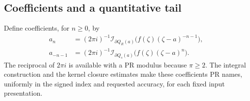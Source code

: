 \documentclass[11pt]{article}
\theoremstyle{definition}
\newcommand{\Int}{\mathcal I}
\newcommand{\bd}{\partial}
\begin{document}
\subsection{Coefficients and a quantitative tail}

Define coefficients, for \(n\ge0\), by
\begin{align}
 a_n&=(2\pi i)^{-1}
      \Int_{\bd Q_R(a)}\bigl(f(\zeta)(\zeta-a)^{-n-1}\bigr),
       \label{eq:poscoeff}\\
 a_{-n-1}&=(2\pi i)^{-1}
      \Int_{\bd Q_s(a)}\bigl(f(\zeta)(\zeta-a)^n\bigr).
       \label{eq:negcoeff}
\end{align}
The reciprocal of \(2\pi i\) is available with a PR modulus because
\(\pi\ge2\). The integral construction and the kernel closure estimates
make these coefficients PR names, uniformly in the signed index and
requested accuracy, for each fixed input presentation.
\end{document}
